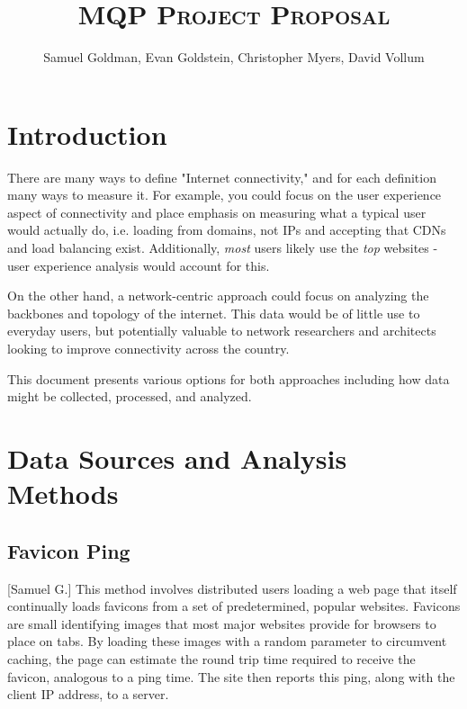 \documentclass[12pt]{article}
\title{\scshape MQP Project Proposal}
\author{Samuel Goldman, Evan Goldstein, Christopher Myers, David Vollum}
\begin{document}
\maketitle
\newpage

\tableofcontents\newpage
\listoffigures
\newpage

\pagestyle{fancy}
\onehalfspacing

\section{Introduction}
There are many ways to define "Internet connectivity," and for each definition many ways to measure it. For example, you could focus on the user experience aspect of connectivity and place emphasis on measuring what a typical user would actually do, i.e. loading from domains, not IPs and accepting that CDNs and load balancing exist. Additionally, \textit{most} users likely use the \textit{top} websites - user experience analysis would account for this.

On the other hand, a network-centric approach could focus on analyzing the backbones and topology of the internet. This data would be of little use to everyday users, but potentially valuable to network researchers and architects looking to improve connectivity across the country.

This document presents various options for both approaches including how data might be collected, processed, and analyzed.

\newpage

\section{Data Sources and Analysis Methods}
\subsection{Favicon Ping}[Samuel G.]
This method involves distributed users loading a web page that itself continually loads favicons from a set of predetermined, popular websites. Favicons are small identifying images that most major websites provide for browsers to place on tabs. By loading these images with a random parameter to circumvent caching, the page can estimate the round trip time required to receive the favicon, analogous to a ping time. The site then reports this ping, along with the client IP address, to a server.
\end{document}
